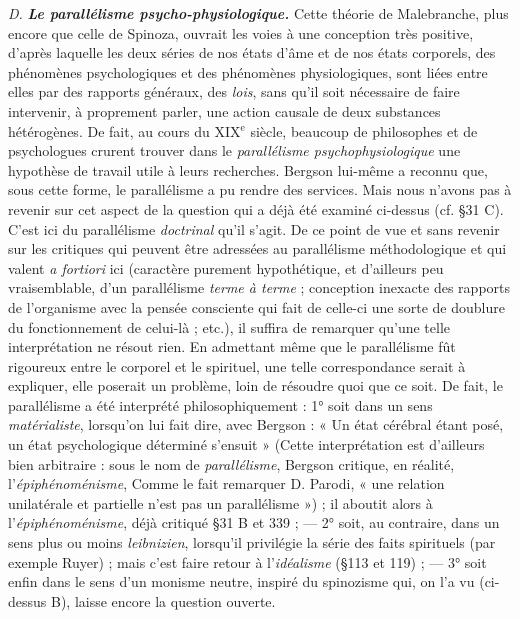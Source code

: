 {\it D.} \textbf{\textit {Le parallélisme psycho-physiologique.}} Cette théorie de Malebranche,
plus encore que celle de Spinoza, ouvrait les voies à une
conception très positive, d’après laquelle les deux séries de nos états
d'âme et de nos états corporels, des phénomènes psychologiques
et des phénomènes physiologiques, sont liées entre elles par des
rapports généraux, des {\it lois}, sans qu’il soit nécessaire de faire intervenir,
à proprement parler, une action causale de deux substances
hétérogènes. De fait, au cours du {\footnotesize XIX}$^\text{e}$ siècle, beaucoup de philosophes
et de psychologues crurent trouver dans le {\it parallélisme psychophysiologique}
une hypothèse de travail utile à leurs recherches.
Bergson lui-même a reconnu que, sous cette forme, le parallélisme
a pu rendre des services. Mais nous n’avons pas à revenir sur cet
aspect de la question qui a déjà été examiné ci-dessus (cf. \S 31 C).
C’est ici du parallélisme {\it doctrinal} qu’il s’agit. De ce point de
vue et sans revenir sur les critiques qui peuvent être adressées au
parallélisme méthodologique et qui valent {\it a fortiori} ici (caractère
purement hypothétique, et d’ailleurs peu vraisemblable, d'un parallélisme
{\it terme à terme} ; conception inexacte des rapports de l’organisme
avec la pensée consciente qui fait de celle-ci une sorte de doublure
du fonctionnement de celui-là ; etc.), il suffira de remarquer qu’une
telle interprétation ne résout rien. En admettant même que le parallélisme
fût rigoureux entre le corporel et le spirituel, une telle correspondance
serait à expliquer, elle poserait un problème, loin de résoudre
quoi que ce soit. De fait, le parallélisme a été interprété philosophiquement :
1° soit dans un sens {\it matérialiste}, lorsqu’on lui fait dire, avec
Bergson : « Un état cérébral étant posé, un état psychologique
déterminé s'ensuit »
{\scriptsize (Cette interprétation est d'ailleurs bien arbitraire : sous le nom de {\it parallélisme},
Bergson critique, en réalité, l'{\it épiphénoménisme}, Comme le fait remarquer D. Parodi,
« une relation unilatérale et partielle n'est pas un parallélisme »)} ; il aboutit alors à l’{\it épiphénoménisme}, déjà
critiqué \S 31 B et 339 ; — 2° soit, au contraire, dans un sens plus ou
moins {\it leibnizien}, lorsqu'il privilégie la série des faits spirituels (par
exemple Ruyer) ; mais c’est faire retour à l’{\it idéalisme} (\S 113 et 119) ;
— 3° soit enfin dans le sens d’un monisme neutre, inspiré du spinozisme
qui, on l’a vu (ci-dessus B), laisse encore la question ouverte.

